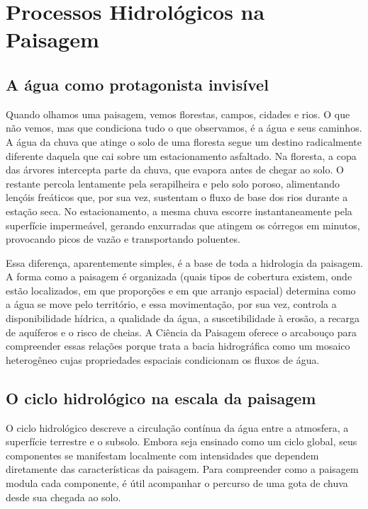 \documentclass[
  portuguese,
  11pt,
  a4paper,
  open=any]{scrbook}
\begin{document}
\chapter{Processos Hidrológicos na
Paisagem}\label{sec-processos-hidrologicos}

\section{A água como protagonista
invisível}\label{a-uxe1gua-como-protagonista-invisuxedvel}

Quando olhamos uma paisagem, vemos florestas, campos, cidades e rios. O
que não vemos, mas que condiciona tudo o que observamos, é a água e seus
caminhos. A água da chuva que atinge o solo de uma floresta segue um
destino radicalmente diferente daquela que cai sobre um estacionamento
asfaltado. Na floresta, a copa das árvores intercepta parte da chuva,
que evapora antes de chegar ao solo. O restante percola lentamente pela
serapilheira e pelo solo poroso, alimentando lençóis freáticos que, por
sua vez, sustentam o fluxo de base dos rios durante a estação seca. No
estacionamento, a mesma chuva escorre instantaneamente pela superfície
impermeável, gerando enxurradas que atingem os córregos em minutos,
provocando picos de vazão e transportando poluentes.

Essa diferença, aparentemente simples, é a base de toda a hidrologia da
paisagem. A forma como a paisagem é organizada (quais tipos de cobertura
existem, onde estão localizados, em que proporções e em que arranjo
espacial) determina como a água se move pelo território, e essa
movimentação, por sua vez, controla a disponibilidade hídrica, a
qualidade da água, a suscetibilidade à erosão, a recarga de aquíferos e
o risco de cheias. A Ciência da Paisagem oferece o arcabouço para
compreender essas relações porque trata a bacia hidrográfica como um
mosaico heterogêneo cujas propriedades espaciais condicionam os fluxos
de água.

\section{O ciclo hidrológico na escala da
paisagem}\label{o-ciclo-hidroluxf3gico-na-escala-da-paisagem}

O ciclo hidrológico descreve a circulação contínua da água entre a
atmosfera, a superfície terrestre e o subsolo. Embora seja ensinado como
um ciclo global, seus componentes se manifestam localmente com
intensidades que dependem diretamente das características da paisagem.
Para compreender como a paisagem modula cada componente, é útil
acompanhar o percurso de uma gota de chuva desde sua chegada ao solo.
\end{document}
